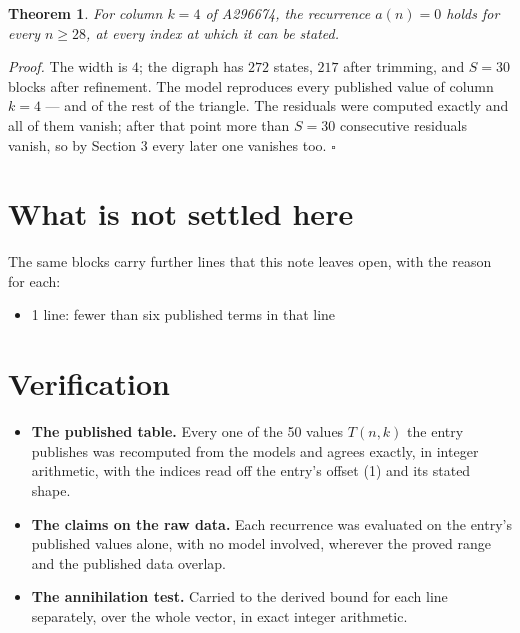 \documentclass[11pt]{article}
\newtheorem{theorem}{Theorem}
\theoremstyle{definition}
\begin{document}
\begin{theorem} For column $k = 4$ of A296674, the recurrence $a(n) = 0$ holds for every $n \ge 28$, at every index at which it can be stated.\end{theorem}

{\itshape Proof.} The width is $4$; the digraph has $272$ states, $217$ after trimming, and $S = 30$ blocks after refinement. The model reproduces every published value of column $k = 4$ --- and of the rest of the triangle. The residuals were computed exactly and all of them vanish; after that point more than $S = 30$ consecutive residuals vanish, so by Section 3 every later one vanishes too. $\square$

\section{What is not settled here}

The same blocks carry further lines that this note leaves open, with the reason for each:

\begin{itemize}

\item 1 line: fewer than six published terms in that line

\end{itemize}

\section{Verification}

\begin{itemize}

\item {\bfseries The published table.} Every one of the 50 values $T(n,k)$ the entry publishes was recomputed from the models and agrees exactly, in integer arithmetic, with the indices read off the entry's offset (1) and its stated shape.

\item {\bfseries The claims on the raw data.} Each recurrence was evaluated on the entry's published values alone, with no model involved, wherever the proved range and the published data overlap.

\item {\bfseries The annihilation test.} Carried to the derived bound for each line separately, over the whole vector, in exact integer arithmetic.

\end{itemize}
\end{document}
